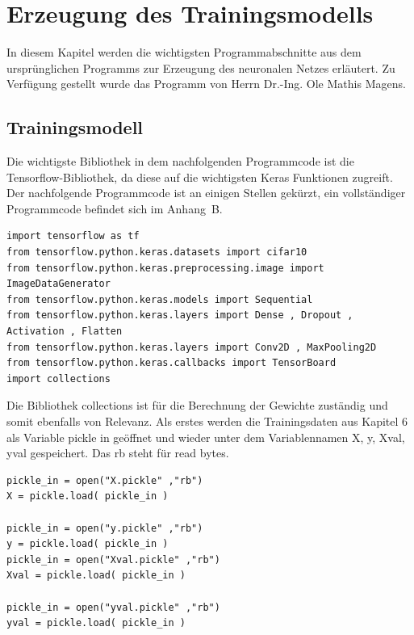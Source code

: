 %
%

\chapter{Erzeugung des Trainingsmodells}


In diesem Kapitel werden die wichtigsten Programmabschnitte aus dem ursprünglichen
Programms zur Erzeugung des neuronalen Netzes erläutert. Zu Verfügung gestellt wurde
das Programm von Herrn Dr.-Ing. Ole Mathis Magens.

\section{Trainingsmodell}

Die wichtigste Bibliothek in dem nachfolgenden Programmcode ist die Tensorflow-Bibliothek,
da diese auf die wichtigsten Keras Funktionen zugreift. Der nachfolgende Programmcode
ist an einigen Stellen gekürzt, ein vollständiger Programmcode befindet sich im Anhang~B.

\begin{lstlisting}
import tensorflow as tf
from tensorflow.python.keras.datasets import cifar10
from tensorflow.python.keras.preprocessing.image import ImageDataGenerator
from tensorflow.python.keras.models import Sequential
from tensorflow.python.keras.layers import Dense , Dropout , Activation , Flatten
from tensorflow.python.keras.layers import Conv2D , MaxPooling2D
from tensorflow.python.keras.callbacks import TensorBoard
import collections
\end{lstlisting}

	Die Bibliothek collections ist für die Berechnung der Gewichte zuständig und somit 
	ebenfalls von Relevanz.
	Als erstes werden die Trainingsdaten aus Kapitel 6 als Variable pickle in geöffnet und
	wieder unter dem Variablennamen X, y, Xval, yval gespeichert. Das rb steht für read
	bytes.

\begin{lstlisting}
pickle_in = open("X.pickle" ,"rb")
X = pickle.load( pickle_in )

pickle_in = open("y.pickle" ,"rb")
y = pickle.load( pickle_in )
pickle_in = open("Xval.pickle" ,"rb")
Xval = pickle.load( pickle_in )

pickle_in = open("yval.pickle" ,"rb")
yval = pickle.load( pickle_in )
\end{lstlisting}


